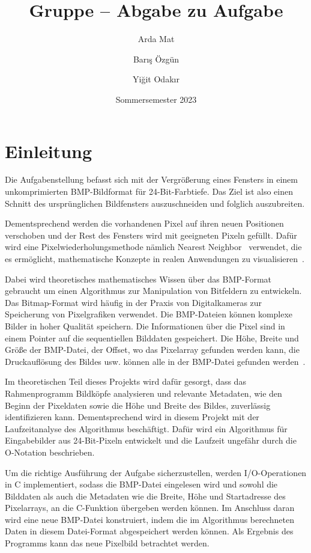 \documentclass[course=erap]{aspdoc}
\author{Arda Mat \and Barış Özgün \and Yiğit Odakır}
\date{Sommersemester 2023} %
\title{Gruppe \theGroup{} -- Abgabe zu Aufgabe \theNumber}
\begin{document}
    \maketitle

    \section{Einleitung}\label{sec:einleitung}

    Die Aufgabenstellung befasst sich mit der Vergrößerung eines Fensters in einem
    unkomprimierten BMP-Bildformat für 24-Bit-Farbtiefe.
    Das Ziel ist also einen
    Schnitt des ursprünglichen Bildfensters auszuschneiden und folglich auszubreiten.

    Dementsprechend werden die vorhandenen Pixel auf ihren neuen Positionen verschoben
    und der Rest des Fensters wird mit geeigneten Pixeln gefüllt.
    Dafür wird eine Pixelwiederholungsmethode
    nämlich Nearest Neighbor~\cite{imageScalingAlgorithms} verwendet, die es ermöglicht,
    mathematische Konzepte in realen Anwendungen zu visualisieren~\cite{nearestNeighborInterpolation}.

    Dabei wird theoretisches mathematisches Wissen über das BMP-Format gebraucht um einen Algorithmus zur
    Manipulation von Bitfeldern zu entwickeln.
    Das Bitmap-Format wird häufig in der Praxis von Digitalkameras
    zur Speicherung von Pixelgrafiken verwendet.
    Die BMP-Dateien können komplexe Bilder in hoher Qualität speichern.
    Die Informationen über die Pixel sind in einem Pointer auf die sequentiellen Bilddaten gespeichert.
    Die Höhe, Breite und Größe der BMP-Datei, der Offset, wo das Pixelarray gefunden werden kann, die Druckauflösung des Bildes usw.
    können alle in der BMP-Datei gefunden werden~\cite{typesOfBitmaps}.

    Im theoretischen Teil dieses Projekts wird dafür gesorgt, dass das Rahmenprogramm Bildköpfe analysieren und relevante
    Metadaten, wie den Beginn der Pixeldaten sowie die Höhe und Breite des Bildes, zuverlässig identifizieren kann.
    Dementsprechend wird in diesem Projekt mit der Laufzeitanalyse des Algorithmus beschäftigt.
    Dafür wird ein Algorithmus für Eingabebilder aus 24-Bit-Pixeln entwickelt
    und die Laufzeit ungefähr durch die O-Notation beschrieben.

    Um die richtige Ausführung der Aufgabe sicherzustellen, werden
    I/O-Operationen in C implementiert, sodass die BMP-Datei eingelesen wird und sowohl die Bilddaten als auch die Metadaten
    wie die Breite, Höhe und Startadresse des Pixelarrays, an die C-Funktion übergeben werden können.
    Im Anschluss daran wird eine neue BMP-Datei konstruiert, indem die im Algorithmus berechneten
    Daten in diesem Datei-Format abgespeichert werden können.
    Als Ergebnis des Programms kann das neue Pixelbild betrachtet werden.
\end{document}
